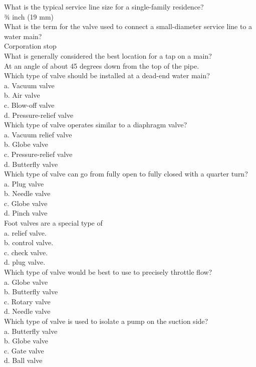 What is the typical service line size for a single-family residence?\\
¾ inch (19 mm)\\
What is the term for the valve used to connect a small-diameter service line to a water main?\\
Corporation stop\\
What is generally considered the best location for a tap on a main?\\
At an angle of about 45 degrees down from the top of the pipe.\\
Which type of valve should be installed at a dead-end water main?\\
a.	Vacuum valve\\
b.	Air valve\\
c.	Blow-off valve\\
d.	Pressure-relief valve\\
Which type of valve operates similar to a diaphragm valve?\\
a.	Vacuum relief valve\\
b.	Globe valve\\
c.	Pressure-relief valve\\
d.	Butterfly valve\\
Which type of valve can go from fully open to fully closed with a quarter turn?\\
a.	Plug valve\\
b.	Needle valve\\
c.	Globe valve\\
d.	Pinch valve\\
Foot valves are a special type of\\
a.	relief valve.\\
b.	control valve.\\
c.	check valve.\\
d.	plug valve.\\
Which type of valve would be best to use to precisely throttle flow?\\
a.	Globe valve\\
b.	Butterfly valve\\
c.	Rotary valve\\
d.	Needle valve\\
Which type of valve is used to isolate a pump on the suction side?\\
a.	Butterfly valve\\
b.	Globe valve\\
c.	Gate valve\\
d.	Ball valve\\

